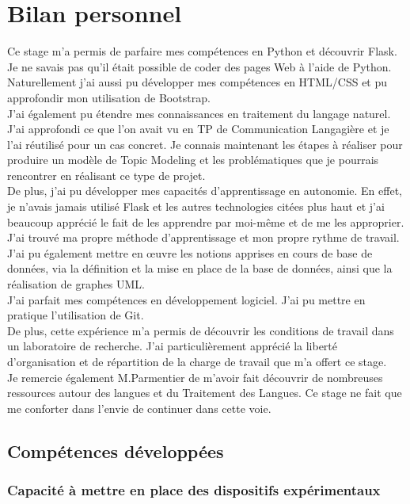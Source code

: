\documentclass[12pt]{article}
\begin{document}
\section{Bilan personnel}


Ce stage m’a permis de parfaire mes compétences en Python et découvrir Flask. Je ne savais pas qu’il était possible de coder des pages Web à l’aide de Python. Naturellement j’ai aussi pu développer mes compétences en HTML/CSS et pu approfondir mon utilisation de Bootstrap. \\
J'ai également pu étendre mes connaissances en traitement du langage naturel. J'ai approfondi ce que l'on avait vu en TP de Communication Langagière et je l'ai réutilisé pour un cas concret. Je connais maintenant les étapes à réaliser pour produire un modèle de Topic Modeling et les problématiques que je pourrais rencontrer en réalisant ce type de projet. \\
De plus, j'ai pu développer mes capacités d'apprentissage en autonomie. En effet, je n'avais jamais utilisé Flask et les autres technologies citées plus haut et j'ai beaucoup apprécié le fait de les apprendre par moi-même et de me les approprier. J'ai trouvé ma propre méthode d'apprentissage et mon propre rythme de travail. \\
J’ai pu également mettre en œuvre les notions apprises en cours de base de données, via la définition et la mise en place de la base de données, ainsi que la réalisation de graphes UML. \\
J'ai parfait mes compétences en développement logiciel. J'ai pu mettre en pratique l'utilisation de Git. \\
De plus, cette expérience m’a permis de découvrir les conditions de travail dans un laboratoire de recherche. J’ai particulièrement apprécié la liberté d’organisation et de répartition de la charge de travail que m’a offert ce stage. \\

Je remercie également M.Parmentier de m'avoir fait découvrir de  nombreuses ressources autour des langues et du Traitement des Langues. Ce stage ne fait que me conforter dans l'envie de continuer dans cette voie. 

\subsection{Compétences développées}

\subsubsection*{Capacité à mettre en place des dispositifs expérimentaux  }
\end{document}
